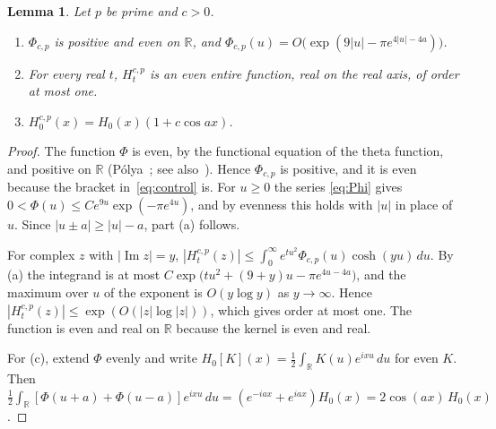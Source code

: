 \documentclass[11pt]{article}
\numberwithin{equation}{section}
\newtheorem{lemma}[theorem]{Lemma}
\theoremstyle{definition}
\theoremstyle{remark}
\DeclareMathOperator{\Ima}{Im}
\newcommand{\dd}{\,d}
\begin{document}
\begin{lemma}\label{lem:kernel}
Let $p$ be prime and $c>0$.
\begin{enumerate}[label=\textup{(\alph*)}]
\item $\Phi_{c,p}$ is positive and even on $\mathbb R$, and
$\Phi_{c,p}(u)=O\bigl(\exp(9|u|-\pi e^{4|u|-4a})\bigr)$.
\item For every real $t$, $H^{c,p}_t$ is an even entire function, real on
the real axis, of order at most one.
\item $H^{c,p}_0(x)=H_0(x)(1+c\cos ax)$.
\end{enumerate}
\end{lemma}

\begin{proof}
The function $\Phi$ is even, by the functional equation of the theta function,
and positive on $\mathbb R$ (P\'olya~\cite{polya}; see
also~\cite{csordasnorfolkvarga}). Hence $\Phi_{c,p}$ is positive, and it is even
because the bracket in~\eqref{eq:control} is. For $u\ge0$ the series
\eqref{eq:Phi} gives $0<\Phi(u)\le C e^{9u}\exp(-\pi e^{4u})$, and by
evenness this holds with $|u|$ in place of $u$. Since
$|u\pm a|\ge|u|-a$, part (a) follows.

For complex $z$ with $|\Ima z|=y$,
$|H^{c,p}_t(z)|\le\int_0^\infty e^{tu^2}\Phi_{c,p}(u)\cosh(yu)\dd u$. By
(a) the integrand is at most
$C\exp\bigl(tu^2+(9+y)u-\pi e^{4u-4a}\bigr)$, and the maximum over $u$ of
the exponent is $O(y\log y)$ as $y\to\infty$. Hence
$|H^{c,p}_t(z)|\le\exp(O(|z|\log|z|))$, which gives order at most one.
The function is even and real on $\mathbb R$ because the kernel is even and
real.

For (c), extend $\Phi$ evenly and write
$H_0[K](x)=\tfrac12\int_{\mathbb R}K(u)e^{ixu}\dd u$ for even $K$. Then
$\tfrac12\int_{\mathbb R}[\Phi(u+a)+\Phi(u-a)]e^{ixu}\dd u
=(e^{-iax}+e^{iax})H_0(x)=2\cos(ax)\,H_0(x)$.
\end{proof}
\end{document}

